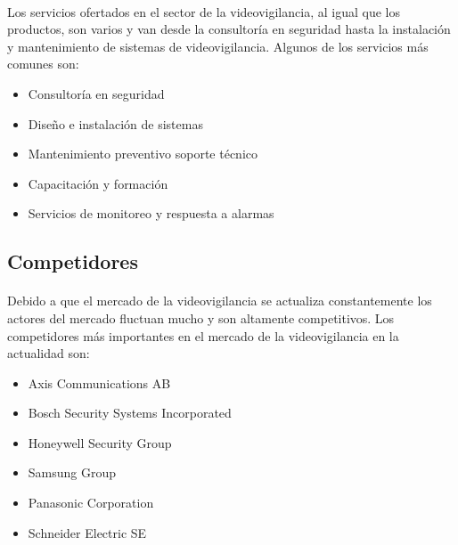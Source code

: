 \documentclass{report}
\begin{document}
          \paragraph*{}
          {
            Los servicios ofertados en el sector de la videovigilancia, al igual que los productos, son varios y van desde la consultoría en seguridad hasta la instalación y mantenimiento de sistemas de videovigilancia. 
            Algunos de los servicios más comunes son: \cite{wiki-videovigilancia-ip}
          }
          \begin{itemize}
            \item Consultoría en seguridad
            \item Diseño e instalación de sistemas
            \item Mantenimiento preventivo soporte técnico
            \item Capacitación y formación
            \item Servicios de monitoreo y respuesta a alarmas
          \end{itemize}
        \subsection*{Competidores}
          \paragraph*{}{Debido a que el mercado de la videovigilancia se actualiza constantemente los actores del mercado fluctuan mucho y son altamente competitivos. Los competidores más importantes en el mercado de la videovigilancia en la actualidad son:}
          \begin{multicols}{3}
            \begin{itemize}
              \item Axis Communications AB
              \item Bosch Security Systems Incorporated
              \item Honeywell Security Group
              \item Samsung Group
              \item Panasonic Corporation
              \item Schneider Electric SE
            \end{itemize}
          \end{multicols}
\end{document}
